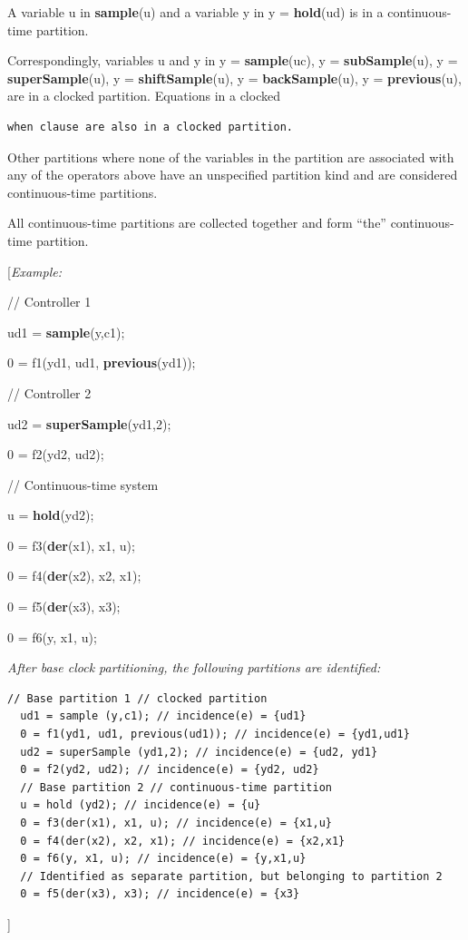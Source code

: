 \documentclass[10pt,a4paper]{report}
\begin{document}
A variable u in \textbf{sample}(u) and a variable y in y =
\textbf{hold}(ud) is in a continuous-time partition.

Correspondingly, variables u and y in y = \textbf{sample}(uc), y =
\textbf{subSample}(u), y = \textbf{superSample}(u), y =
\textbf{shiftSample}(u), y = \textbf{backSample}(u), y =
\textbf{previous}(u), are in a clocked partition. Equations in a clocked
\begin{lstlisting}[language=modelica]
when clause are also in a clocked partition.
\end{lstlisting}
Other partitions where none of the variables in the partition are
associated with any of the operators above have an unspecified partition
kind and are considered continuous-time partitions.

All continuous-time partitions are collected together and form ``the''
continuous-time partition.

{[}\emph{Example:}

// Controller 1

ud1 = \textbf{sample}(y,c1);

0 = f1(yd1, ud1, \textbf{previous}(yd1));

// Controller 2

ud2 = \textbf{superSample}(yd1,2);

0 = f2(yd2, ud2);

// Continuous-time system

u = \textbf{hold}(yd2);

0 = f3(\textbf{der}(x1), x1, u);

0 = f4(\textbf{der}(x2), x2, x1);

0 = f5(\textbf{der}(x3), x3);

0 = f6(y, x1, u);

\emph{After base clock partitioning, the following partitions are
identified:}

\begin{lstlisting}[language=modelica]
  // Base partition 1 // clocked partition
  ud1 = sample (y,c1); // incidence(e) = {ud1}
  0 = f1(yd1, ud1, previous(ud1)); // incidence(e) = {yd1,ud1}
  ud2 = superSample (yd1,2); // incidence(e) = {ud2, yd1}
  0 = f2(yd2, ud2); // incidence(e) = {yd2, ud2}
  // Base partition 2 // continuous-time partition
  u = hold (yd2); // incidence(e) = {u}
  0 = f3(der(x1), x1, u); // incidence(e) = {x1,u}
  0 = f4(der(x2), x2, x1); // incidence(e) = {x2,x1}
  0 = f6(y, x1, u); // incidence(e) = {y,x1,u}
  // Identified as separate partition, but belonging to partition 2
  0 = f5(der(x3), x3); // incidence(e) = {x3}
\end{lstlisting}
{]}
\end{document}
